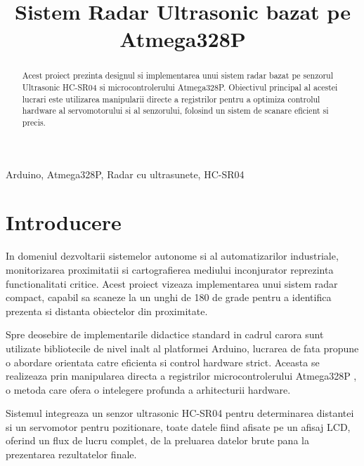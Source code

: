 \documentclass[conference]{IEEEtran}
\begin{document}
\title{Sistem Radar Ultrasonic bazat pe Atmega328P}

\author{
}

\maketitle

\begin{abstract}

Acest proiect prezinta designul si implementarea unui sistem radar bazat pe senzorul Ultrasonic HC-SR04 si microcontrolerului Atmega328P. Obiectivul principal al acestei lucrari este utilizarea manipularii directe a registrilor pentru a optimiza controlul hardware al servomotorului si al senzorului, folosind un sistem de scanare eficient si precis.
\end{abstract}

\begin{IEEEkeywords}
Arduino, Atmega328P, Radar cu ultrasunete, HC-SR04
\end{IEEEkeywords}

\thispagestyle{firstpagefooter}

\section{Introducere}

In domeniul dezvoltarii sistemelor autonome si al automatizarilor industriale, monitorizarea proximitatii si cartografierea mediului inconjurator reprezinta functionalitati critice. Acest proiect vizeaza implementarea unui sistem radar compact, capabil sa scaneze la un unghi de 180 de grade pentru a identifica prezenta si distanta obiectelor din proximitate.

Spre deosebire de implementarile didactice standard in cadrul carora sunt utilizate bibliotecile de nivel inalt al platformei Arduino, lucrarea de fata propune o abordare orientata catre eficienta si control hardware strict. Aceasta se realizeaza prin manipularea directa a registrilor microcontrolerului Atmega328P , o metoda care ofera o intelegere profunda a arhitecturii hardware. 

Sistemul integreaza un senzor ultrasonic HC-SR04 pentru determinarea distantei si un servomotor pentru pozitionare, toate datele fiind afisate pe un afisaj LCD, oferind un flux de lucru complet, de la preluarea datelor brute pana la prezentarea rezultatelor finale.
\end{document}
